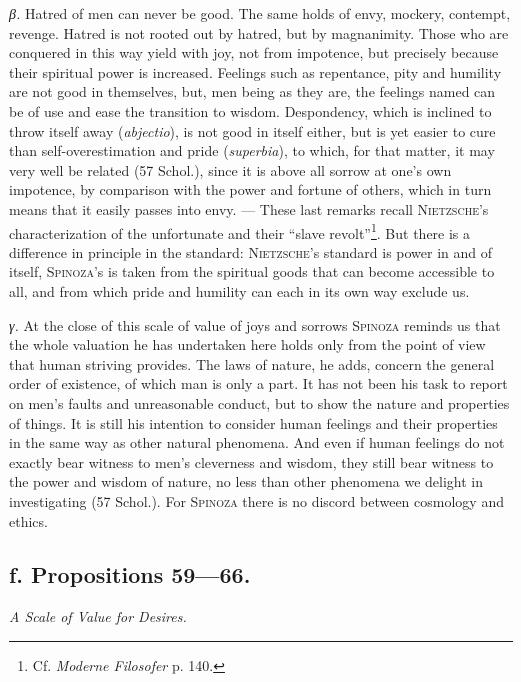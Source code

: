 \documentclass[12pt]{article}
\newcommand{\opage}[1]{\marginnote{\footnotesize\textit{[#1]}}}
\begin{document}
\textit{β.} Hatred of men can never be good. The same holds of envy, mockery, contempt, revenge.
Hatred is not rooted out by hatred, but by magnanimity. Those who are conquered in this way yield
with joy, not from impotence, but precisely because their spiritual power is increased. Feelings
such as repentance, pity and humility are not good in themselves, but, men being as they are, the
feelings named can be of use and ease the transition to wisdom. Despondency, which is inclined to
throw itself away (\textit{abjectio}), is not good in itself either, but is yet easier to cure than
self-overestimation and pride (\textit{superbia}), to which, for that matter, it may very well be
related (57 Schol.), since it is above all sorrow at one's own impotence, by comparison with the
power and fortune of others, which in turn means that it easily passes into envy. --- These last
remarks recall \textsc{Nietzsche}'s characterization of the unfortunate and their ``slave
revolt''\footnote{Cf. \textit{Moderne Filosofer} p. 140.}. But there is a difference in principle
in the standard: \textsc{Nietzsche}'s standard is power in and of itself, \textsc{Spinoza}'s
\opage{80}is taken from the spiritual goods that can become accessible to all, and from which pride
and humility can each in its own way exclude us.

\textit{γ.} At the close of this scale of value of joys and sorrows \textsc{Spinoza} reminds us that
the whole valuation he has undertaken here holds only from the point of view that human striving
provides. The laws of nature, he adds, concern the general order of existence, of which man is only
a part. It has not been his task to report on men's faults and unreasonable conduct, but to show
the nature and properties of things. It is still his intention to consider human feelings and
their properties in the same way as other natural phenomena. And even if human feelings do not
exactly bear witness to men's cleverness and wisdom, they still bear witness to the power and
wisdom of nature, no less than other phenomena we delight in investigating (57 Schol.). For
\textsc{Spinoza} there is no discord between cosmology and ethics.

\subsection*{f. Propositions 59---66.}
\begin{center}\textit{A Scale of Value for Desires.}\end{center}
\end{document}
